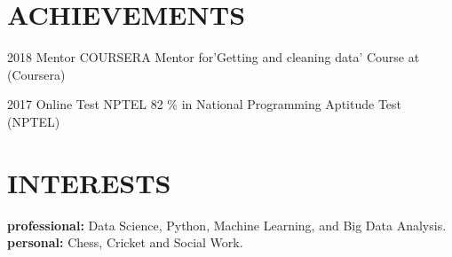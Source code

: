 \documentclass[]{cv-style}          %
\begin{document}

\section{ACHIEVEMENTS}

\begin{entrylist}
\entry
{2018}
{Mentor}
{COURSERA}
{Mentor for’Getting and cleaning data’ Course at (Coursera)}
\end{entrylist}
\begin{entrylist}
%
\entry
{2017}
{Online Test}
{NPTEL}
{82 \% in National Programming Aptitude Test (NPTEL)}

\end{entrylist}



\section{INTERESTS}
  \vspace{-0.2cm}

\textbf{professional:} Data Science, Python, Machine Learning,  and Big Data Analysis.\newline
\textbf{personal:} Chess, Cricket and Social Work.

\end{document}
